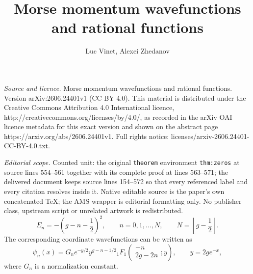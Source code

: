 \documentclass[10pt,a4paper]{amsart}
\newcommand{\floor}[1]{\left\lfloor #1\right\rfloor}
\numberwithin{equation}{section}
\begin{document}
\title[Morse momentum wavefunctions and rational functions]{Morse momentum wavefunctions and rational functions}
\author{Luc Vinet, Alexei Zhedanov}
\date{}
\maketitle
\noindent\emph{Source and licence.} Morse momentum wavefunctions and rational functions. Version arXiv:2606.24401v1 (CC BY 4.0). This material is distributed under the Creative Commons Attribution 4.0 International licence, http://creativecommons.org/licenses/by/4.0/, as recorded in the arXiv OAI licence metadata for this exact version and shown on the abstract page https://arxiv.org/abs/2606.24401v1. Full rights notice: licenses/arxiv-2606.24401-CC-BY-4.0.txt.\par\smallskip
\noindent\textit{Editorial scope.} Counted unit: the original \texttt{theorem} environment \texttt{thm:zeros} at source lines 554--561 together with its complete proof at lines 563--571; the delivered document keeps source lines 154--572 so that every referenced label and every citation resolves inside it. Native editable source is the paper's own concatenated TeX; the AMS wrapper is editorial formatting only. No publisher class, upstream script or unrelated artwork is redistributed.
\begin{equation}
  E_n=-\left(g-n-\frac12\right)^2,
  \qquad n=0,1,\dots,N,
  \qquad N=\floor{g-\frac12}.
  \label{eq:energies}
\end{equation}
The corresponding coordinate wavefunctions can be written as
\begin{equation}
  \psi_n(x)=G_n e^{-y/2} y^{g-n-1/2}
  {}_1F_1\!\left(
  \begin{matrix}-n\\ 2g-2n\end{matrix};y
  \right),
  \qquad y=2g e^{-x},
  \label{eq:coordinate_wavefunctions}
\end{equation}
where $G_n$ is a normalization constant.
\end{document}
